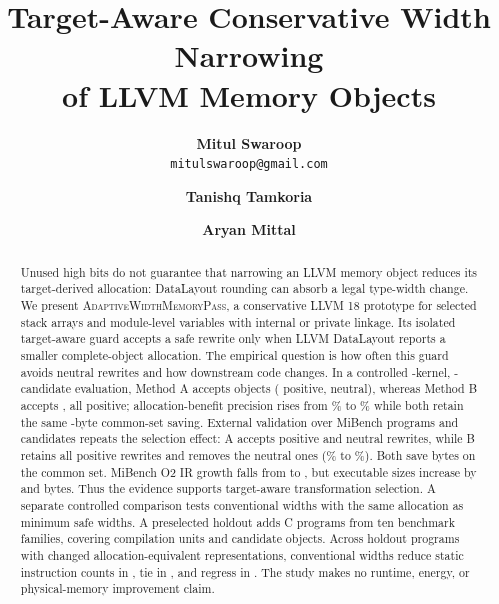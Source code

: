 \documentclass[11pt,twocolumn]{article}
\title{\vspace{-0.55in}\bfseries Target-Aware Conservative Width Narrowing\\of LLVM Memory Objects}
\author{\textbf{Mitul Swaroop}\\[-1pt]
  \normalsize\texttt{mitulswaroop@gmail.com}
  \and
  \textbf{Tanishq Tamkoria}
  \and
  \textbf{Aryan Mittal}}
\date{}
\begin{document}
\raggedbottom
\maketitle
\nocite{heo2025bitlevel,mahlke2001bitwidth,nandivada2013packing,bhaskaracharya2016storage,lee2006accuracy,jain2019executable,cherubin2020survey,jantz2014phase,zhou2021bugs,evenmendoza2022csmith}
\vspace{-0.35in}

\begin{abstract}
Unused high bits do not guarantee that narrowing an LLVM memory object reduces
its target-derived allocation: DataLayout rounding can absorb a legal type-width
change. We present \textsc{AdaptiveWidthMemoryPass}, a conservative LLVM 18
prototype for selected stack arrays and module-level variables with internal
or private linkage. Its isolated
target-aware guard accepts a safe rewrite only when LLVM DataLayout reports a
smaller complete-object allocation. The empirical question is how often this
guard avoids neutral rewrites and how downstream code changes. In a controlled \BenchmarkCount{}-kernel,
\CandidateTotal{}-candidate evaluation, Method A accepts \ATransformed{}
objects (\APositive{} positive, \AZero{} neutral), whereas Method B accepts
\BTransformed{}, all positive; allocation-benefit precision rises from
\APrecision\% to \BPrecision\% while both retain the same
\CommonSavedBytes{}-byte common-set saving. External validation over
\ExternalPrograms{} MiBench programs and \ExternalCandidates{} candidates
repeats the selection effect: A accepts \ExternalAPositive{} positive and
\ExternalAZero{} neutral rewrites, while B retains all
\ExternalBPositive{} positive rewrites and removes the neutral ones
(\ExternalAPrecision\% to \ExternalBPrecision\%). Both save
\ExternalCommonSaved{} bytes on the common set. MiBench O2 IR growth falls from
\ExternalAOtwoIR{} to \ExternalBOtwoIR{}, but executable sizes increase by
\ExternalAExecutableDelta{} and \ExternalBExecutableDelta{} bytes. Thus the
evidence supports target-aware transformation selection. A separate controlled
comparison tests conventional widths with the same allocation as minimum safe
widths. A preselected holdout adds \ExpandedPrograms{} C programs from ten
benchmark families, covering \ExpandedUnits{} compilation units and
\ExpandedCandidates{} candidate objects. Across \ExpandedWidthPrograms{}
holdout programs with changed allocation-equivalent representations,
conventional widths reduce static instruction counts in \ExpandedWidthBetter{},
tie in \ExpandedWidthEqual{}, and regress in \ExpandedWidthWorse{}.
The study makes no runtime, energy, or physical-memory improvement claim.
\end{abstract}
\end{document}
